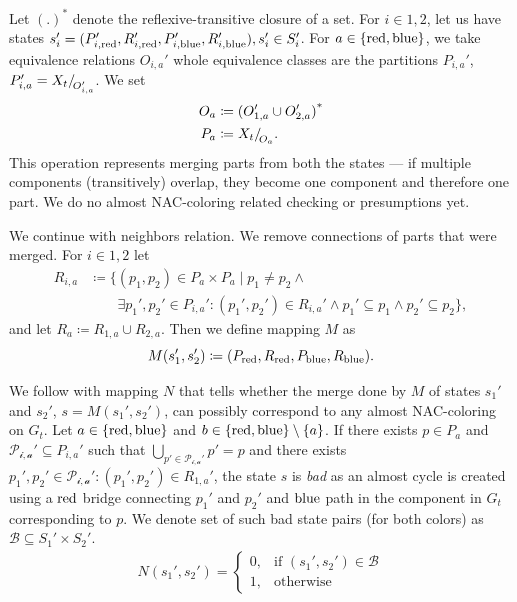 Let \( {(.)}^* \) denote the reflexive-transitive closure of a set.
For \( i \in {1, 2} \), let us have states
\( s_i' = (P_{i,\text{red}}', R_{i,\text{red}}', P_{i,\text{blue}}', R_{i,\text{blue}}'), s_i' \in S_i' \).
%
For \( a \in \{\text{red}, \text{blue}\} \),
we take equivalence relations \( O_{i, a}' \)
whole equivalence classes are the partitions \( P_{i, a}' \),
\( P_{i, a}' = X_t{/\!}_{O_{i, a}'}\).
We set
%
\begin{align*}
	O_a & \coloneqq {(O_{1, a}' \cup O_{2, a}')}^* \\
	P_a & \coloneqq X_t{/\!}_{O_a}.
\end{align*}
%
This operation represents merging parts from both the states
--- if multiple components (transitively) overlap, they become one
component and therefore one part.
We do no almost NAC-coloring related checking or presumptions yet.

We continue with neighbors relation. We remove connections of parts
that were merged. For \( i \in {1, 2} \) let
%
\begin{align*}
	R_{i,a} & \coloneqq \{(p_1, p_2) \in P_a \times P_a \mid p_{1} \ne p_{2} \land                                                    \\
	        & \qquad \exists p_1', p_2' \in P_{i,a}' : (p_1', p_2') \in R_{i,a}' \land p_1' \subseteq p_1 \land p_2' \subseteq p_2\},
\end{align*}
%
and let \( R_a \coloneqq R_{1,a} \cup R_{2,a} \).
Then we define mapping \( M \) as
\[ M(s_1', s_2') \coloneqq (P_{\text{red}}, R_{\text{red}}, P_{\text{blue}}, R_{\text{blue}}). \]

We follow with mapping \( N \) that tells whether the merge done by \( M \)
of states \( s_1' \) and \( s_2' \), \( s = M(s_1', s_2') \),
can possibly correspond to any almost NAC-coloring on \( G_t \).
%
Let \( a \in \{\text{red}, \text{blue} \} \) and \( b \in \{\text{red}, \text{blue} \} \setminus \{a\} \).
If there exists \( p \in P_{a} \)
and \( \mathcal{P_{i, a}'} \subseteq P_{i, a}' \) such that \( \bigcup_{p' \in \mathcal{P_{i, a}'}} p' = p \)
and there exists \( p_1', p_2' \in \mathcal{P_{i, a}'} : (p_1', p_2') \in R_{1, a}' \),
the state \( s \) is \emph{bad} as an almost cycle is created
using a \( \text{red} \) bridge connecting \( p_1' \) and \( p_2' \) and \( \text{blue} \) path
in the component in \( G_t \) corresponding to \( p \).
%
We denote set of such bad state pairs (for both colors) as \( \mathcal{B} \subseteq S_1' \times S_2' \).
%
\begin{align*}
	N(s_1', s_2') =
	\begin{cases}
		0, & \text{if } (s_1', s_2') \in \mathcal{B} \\
		1, & \text{otherwise}
	\end{cases}
\end{align*}
%

